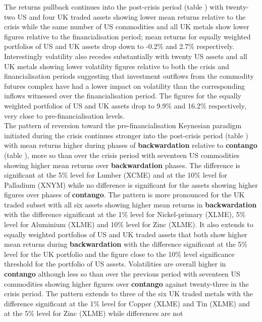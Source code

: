 \documentclass[
  authoryear,
  preprint,
  3p]{elsarticle}
\begin{document}
\medskip

The returns pullback continues into the post-crisis period (table ) with
twenty-two US and four UK traded assets showing lower mean returns
relative to the crisis while the same number of US commodities and all
UK metals show lower figures relative to the financialisation period;
mean returns for equally weighted portfolios of US and UK assets drop
down to -0.2\% and 2.7\% respectively. Interestingly volatility also
recedes substantially with twenty US assets and all UK metals showing
lower volatility figures relative to both the crisis and
financialisation periods suggesting that investment outflows from the
commodity futures complex have had a lower impact on volatility than the
corresponding inflows witnessed over the financialisation period. The
figures for the equally weighted portfolios of US and UK assets drop to
9.9\% and 16.2\% respectively, very close to pre-financialisation
levels.\\
The pattern of reversion toward the pre-financialisation Keynesian
paradigm initiated during the crisis continues stronger into the
post-crisis period (table ) with mean returns higher during phases of
\textbf{backwardation} relative to \textbf{contango} (table ), more so
than over the crisis period with seventeen US commodities showing higher
mean returns over \textbf{backwardation} phases. The difference is
significant at the 5\% level for Lumber (XCME) and at the 10\% level for
Palladium (XNYM) while no difference is significant for the assets
showing higher figures over phases of \textbf{contango}. The pattern is
more pronounced for the UK traded subset with all six assets showing
higher mean returns in \textbf{backwardation} with the difference
significant at the 1\% level for Nickel-primary (XLME), 5\% level for
Aluminium (XLME) and 10\% level for Zinc (XLME). It also extends to
equally weighted portfolios of US and UK traded assets that both show
higher mean returns during \textbf{backwardation} with the difference
significant at the 5\% level for the UK portfolio and the figure close
to the 10\% level significance threshold for the portfolio of US assets.
Volatilities are overall higher in \textbf{contango} although less so
than over the previous period with seventeen US commodities showing
higher figures over \textbf{contango} against twenty-three in the crisis
period. The pattern extends to three of the six UK traded metals with
the difference significant at the 1\% level for Copper (XLME) and Tin
(XLME) and at the 5\% level for Zinc (XLME) while differences are not
\end{document}
